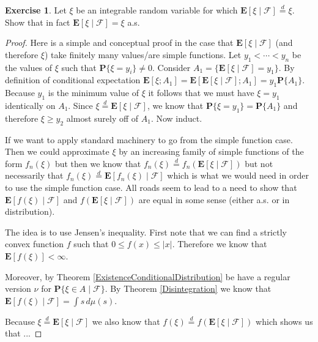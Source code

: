 \documentclass{amsbook}
\theoremstyle{definition}
\newtheorem{xca}{Exercise}
\theoremstyle{remark}
\newcommand{\expectation}[1]{\textbf{E}\left[#1\right]}
\newcommand{\cexpectationlong}[2]{\textbf{E}\left[ #2 \mid #1 \right]}
\newcommand{\probability}[1]{\textbf{P}\{#1\}}
\newcommand{\cprobability}[2]{\textbf{P}\{#2 \mid #1\}}
\newcommand{\abs}[1]{\left \vert #1 \right \vert}
\newcommand{\eqdist}{\overset{d}=}
\begin{document}
\begin{xca}Let $\xi$ be an integrable random variable for which
  $\cexpectationlong{\mathcal{F}}{\xi} \eqdist \xi$.  Show that in
  fact $\cexpectationlong{\mathcal{F}}{\xi} = \xi$ a.s.
\end{xca}
\begin{proof}
Here is a simple and conceptual proof in the case that
$\cexpectationlong{\mathcal{F}}{\xi}$ (and therefore $\xi$) take
finitely many values/are simple functions.  Let $y_1 < \cdots < y_n$ be the values of
$\xi$ such that $\probability{\xi = y_i} \neq 0$.   Consider $A_1 = \lbrace \cexpectationlong{\mathcal{F}}{\xi} =
y_1 \rbrace$.  By definition of conditional expectation
$\expectation{\xi ; A_1} =
\expectation{\cexpectationlong{\mathcal{F}}{\xi} ; A_1} = y_1
\probability{A_1}$.  Because $y_1$ is the minimum value of $\xi$ it
follows that we must have $\xi = y_1$ identically on $A_1$.  Since $\xi \eqdist
\cexpectationlong{\mathcal{F}}{\xi} $, we know that $\probability{\xi
  = y_1} = \probability{A_1}$ and therefore $\xi \geq y_2$ almost
surely off of $A_1$.  Now induct.

If we want to apply standard machinery to go from the
simple function case.  Then we could approximate $\xi$ by an
increasing family of simple functions of the form $f_n(\xi)$ but then
we know that $f_n(\xi) \eqdist
f_n(\cexpectationlong{\mathcal{F}}{\xi})$ but not necessarily that $f_n(\xi) \eqdist
\cexpectationlong{\mathcal{F}}{f_n(\xi)}$ which is what we would need
in order to use the simple function case.  All roads seem to lead to a
need to show that $\cexpectationlong{\mathcal{F}}{f(\xi)}$ and
$f(\cexpectationlong{\mathcal{F}}{\xi})$ are equal in some sense
(either a.s. or in distribution).

The idea is to use Jensen's inequality.  First note that
  we can find a strictly convex function $f$ such that $0 \leq f(x)
  \leq \abs{x}$.  Therefore we know that $\expectation{f(\xi)} <
  \infty$.  

Moreover, by Theorem \ref{ExistenceConditionalDistribution} be have a
regular version $\nu$ for $\cprobability{\mathcal{F}}{\xi \in A}$.  By
Theorem \ref{Disintegration} we know that
$\cexpectationlong{\mathcal{F}}{f(\xi)} = \int s \, d\mu(s)$.

Because $\xi \eqdist \cexpectationlong{\mathcal{F}}{\xi}$ we also know
that $f(\xi) \eqdist f(\cexpectationlong{\mathcal{F}}{\xi})$ which
shows us that ... 


\end{proof}
\end{document}
